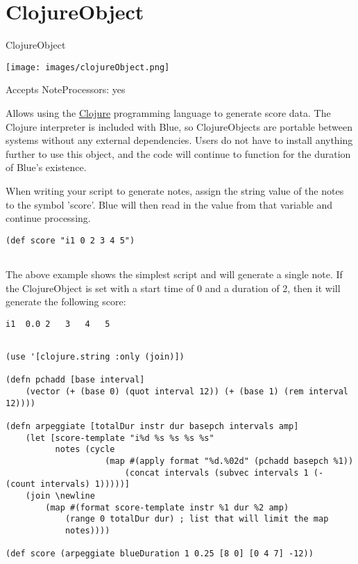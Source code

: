 \section{ClojureObject}\label{clojureObject}

ClojureObject

\texttt{[image: images/clojureObject.png]}

Accepts NoteProcessors: yes

Allows using the \href{http://www.clojure.org}{Clojure} programming
language to generate score data. The Clojure interpreter is included
with Blue, so ClojureObjects are portable between systems without any
external dependencies. Users do not have to install anything further to
use this object, and the code will continue to function for the duration
of Blue's existence.

When writing your script to generate notes, assign the string value of
the notes to the symbol 'score'. Blue will then read in the value from
that variable and continue processing.

\begin{verbatim}
(def score "i1 0 2 3 4 5")
    
\end{verbatim}

The above example shows the simplest script and will generate a single
note. If the ClojureObject is set with a start time of 0 and a duration
of 2, then it will generate the following score:

\begin{verbatim}
i1  0.0 2   3   4   5
    
\end{verbatim}

\begin{verbatim}
(use '[clojure.string :only (join)])

(defn pchadd [base interval] 
    (vector (+ (base 0) (quot interval 12)) (+ (base 1) (rem interval 12))))

(defn arpeggiate [totalDur instr dur basepch intervals amp]
    (let [score-template "i%d %s %s %s %s"
          notes (cycle 
                    (map #(apply format "%d.%02d" (pchadd basepch %1)) 
                        (concat intervals (subvec intervals 1 (- (count intervals) 1)))))]
    (join \newline
        (map #(format score-template instr %1 dur %2 amp) 
            (range 0 totalDur dur) ; list that will limit the map
            notes))))

(def score (arpeggiate blueDuration 1 0.25 [8 0] [0 4 7] -12))
    
\end{verbatim}

